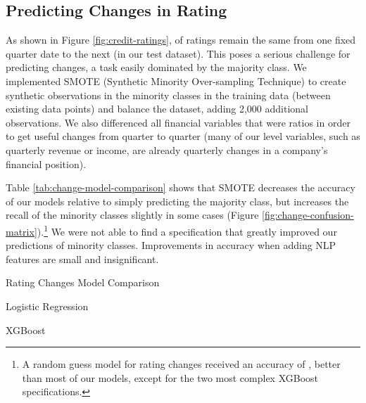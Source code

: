 \documentclass{article}[11pt]
\begin{document}
    \clearpage
    \newpage

    \subsection{Predicting Changes in Rating}

    \label{sec:change-prediction}

    As shown in Figure \ref{fig:credit-ratings}, \shareNotChanges \space of ratings remain the same from one fixed quarter date to the next (\shareNotChangesTest \space in our test dataset). This poses a serious challenge for predicting changes, a task easily dominated by the majority class. We implemented SMOTE (Synthetic Minority Over-sampling Technique) \citep{chawla_smote_2002} to create synthetic observations in the minority classes in the training data (between existing data points) and balance the dataset, adding 2,000 additional observations. We also differenced all financial variables that were ratios in order to get useful changes from quarter to quarter (many of our level variables, such as quarterly revenue or income, are already quarterly changes in a company's financial position).

    Table \ref{tab:change-model-comparison} shows that SMOTE decreases the accuracy of our models relative to simply predicting the majority class, but increases the recall of the minority classes slightly in some cases (Figure \ref{fig:change-confusion-matrix}).\footnote{A random guess model for rating changes received an accuracy of \changeRGAcc, better than most of our models, except for the two most complex XGBoost specifications.} We were not able to find a specification that greatly improved our predictions of minority classes. Improvements in accuracy when adding NLP features are small and insignificant.

    \begin{table}[h!]
        \centering
        \caption{Rating Changes Model Comparison}
        \begin{minipage}[c]{0.45\linewidth}
            \centering
            
            \caption*{\footnotesize Logistic Regression} 
        \end{minipage}
        \begin{minipage}[c]{0.45\linewidth}
            \centering
            
            \caption*{\footnotesize XGBoost} 
        \end{minipage}
        \label{tab:change-model-comparison}
    \end{table}
\end{document}
